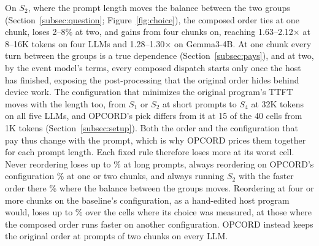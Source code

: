 On $S_2$, where the prompt length moves the balance between the two groups (Section~\ref{subsec:question}; Figure~\ref{fig:choice}), the composed order ties at one chunk, loses 2--8\% at two, and gains from four chunks on, reaching 1.63--2.12$\times$ at 8--16K tokens on four LLMs and 1.28--1.30$\times$ on Gemma3-4B.
At one chunk every turn between the groups is a true dependence (Section~\ref{subsec:pays}), and at two, by the event model's terms, every composed dispatch starts only once the host has finished, exposing the post-processing that the original order hides behind device work.
The configuration that minimizes the original program's TTFT moves with the length too, from $S_1$ or $S_2$ at short prompts to $S_4$ at 32K tokens on all five LLMs, and OPCORD's pick differs from it at 15 of the 40 cells from 1K tokens (Section~\ref{subsec:setup}).
Both the order and the configuration that pay thus change with the prompt, which is why OPCORD prices them together for each prompt length.
Each fixed rule therefore loses more at its worst cell.
Never reordering loses up to \ChoiceNeverMax\% at long prompts, always reordering on OPCORD's configuration \ChoiceAlwaysMax\% at one or two chunks, and always running $S_2$ with the faster order there \ChoiceFixedSTwoMax\% where the balance between the groups moves.
Reordering at four or more chunks on the baseline's configuration, as a hand-edited host program would, loses up to \ChoiceFourBaseMax\% over the \ChoiceFourBaseCells{} cells where its choice was measured, at those where the composed order runs faster on another configuration.
OPCORD instead keeps the original order at prompts of two chunks on every LLM.

